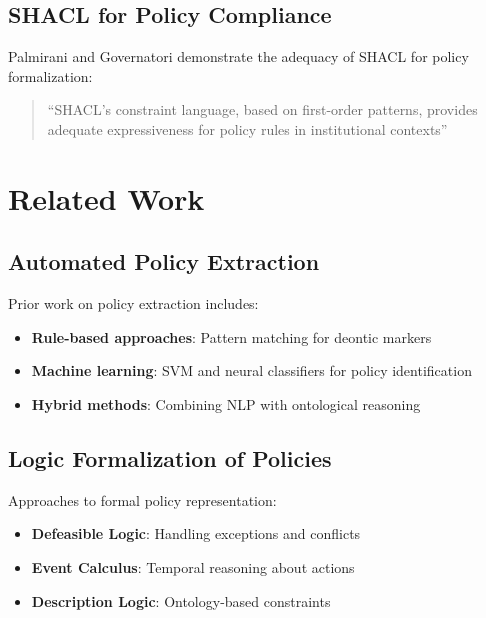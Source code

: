 \subsection{SHACL for Policy Compliance}

Palmirani and Governatori demonstrate the adequacy of SHACL for policy formalization:

\begin{quote}
``SHACL's constraint language, based on first-order patterns, provides adequate expressiveness for policy rules in institutional contexts'' \cite{palmirani2018from}
\end{quote}

\section{Related Work}

\subsection{Automated Policy Extraction}

Prior work on policy extraction includes:

\begin{itemize}
    \item \textbf{Rule-based approaches}: Pattern matching for deontic markers \cite{maxwell2012textual}
    \item \textbf{Machine learning}: SVM and neural classifiers for policy identification \cite{brodie2006automated}
    \item \textbf{Hybrid methods}: Combining NLP with ontological reasoning \cite{wyner2012rule}
\end{itemize}

\subsection{Logic Formalization of Policies}

Approaches to formal policy representation:

\begin{itemize}
    \item \textbf{Defeasible Logic}: Handling exceptions and conflicts \cite{governatori2010defeasible}
    \item \textbf{Event Calculus}: Temporal reasoning about actions \cite{kowalski1989logic}
    \item \textbf{Description Logic}: Ontology-based constraints \cite{baader2003description}
\end{itemize}

